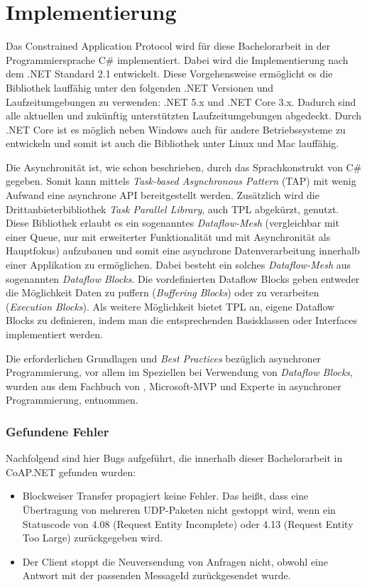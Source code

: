 \section{Implementierung}
\label{sec:implementierung}

Das Constrained Application Protocol wird für diese Bachelorarbeit in der Programmiersprache C\# implementiert. Dabei wird die Implementierung nach dem .NET Standard 2.1 entwickelt. Diese Vorgehensweise ermöglicht es die Bibliothek lauffähig unter den folgenden .NET Versionen und Laufzeitumgebungen zu verwenden: .NET 5.x und .NET Core 3.x. Dadurch sind alle aktuellen und zukünftig unterstützten Laufzeitumgebungen abgedeckt. Durch .NET Core ist es möglich neben Windows auch für andere Betriebssysteme zu entwickeln und somit ist auch die Bibliothek unter Linux und Mac lauffähig.

Die Asynchronität ist, wie schon beschrieben, durch das Sprachkonstrukt von C\# gegeben. Somit kann mittels \textit{Task-based Asynchronous Pattern} (TAP) mit wenig Aufwand eine asynchrone API bereitgestellt werden. Zusätzlich wird die Drittanbieterbibliothek \textit{Task Parallel Library}, auch TPL abgekürzt, genutzt. Diese Bibliothek erlaubt es ein sogenanntes \textit{Dataflow-Mesh} (vergleichbar mit einer Queue, nur mit erweiterter Funktionalität und mit Asynchronität als Hauptfokus) aufzubauen und somit eine asynchrone Datenverarbeitung innerhalb einer Applikation zu ermöglichen. Dabei besteht ein solches \textit{Dataflow-Mesh} aus sogenannten \textit{Dataflow Blocks}. Die vordefinierten Dataflow Blocks geben entweder die Möglichkeit Daten zu puffern (\textit{Buffering Blocks}) oder zu verarbeiten (\textit{Execution Blocks}). Als weitere Möglichkeit bietet TPL an, eigene Dataflow Blocks zu definieren, indem man die entsprechenden Basisklassen oder Interfaces implementiert werden.

Die erforderlichen Grundlagen und \textit{Best Practices} bezüglich asynchroner Programmierung, vor allem im Speziellen bei Verwendung von \textit{Dataflow Blocks}, wurden aus dem Fachbuch  von \citeauthor{cleary2019concurrency}, Microsoft-MVP und Experte in asynchroner Programmierung, entnommen.

\subsubsection{Gefundene Fehler}
\label{subsubsec:gefundende-fehler}

Nachfolgend sind hier Bugs aufgeführt, die innerhalb dieser Bachelorarbeit in CoAP.NET gefunden wurden:
\begin{itemize}
    \item Blockweiser Transfer propagiert keine Fehler. Das heißt, dass eine Übertragung von mehreren UDP-Paketen nicht gestoppt wird, wenn ein Statuscode von 4.08 (Request Entity Incomplete) oder 4.13 (Request Entity Too Large) zurückgegeben wird.
    \item Der Client stoppt die Neuversendung von Anfragen nicht, obwohl eine Antwort mit der passenden MessageId zurückgesendet wurde.
\end{itemize}


